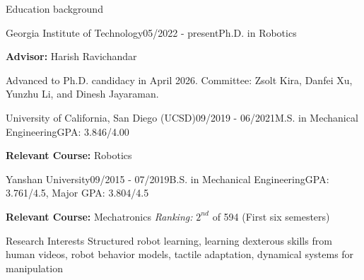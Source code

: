 \documentclass{resume} %
\begin{document}
\begin{rSection}{Education background}
\begin{rSubsection}{Georgia Institute of Technology}{05/2022 - present}{Ph.D. in Robotics}
\item \textbf{Advisor:} Harish Ravichandar
\item Advanced to Ph.D. candidacy in April 2026. Committee: Zsolt Kira, Danfei Xu, Yunzhu Li, and Dinesh Jayaraman.
\end{rSubsection}
\begin{rSubsection}{University of California, San Diego (UCSD)}{09/2019 - 06/2021}{M.S. in Mechanical Engineering}{GPA: 3.846/4.00}
\item \textbf{Relevant Course:} Robotics
\end{rSubsection}
\begin{rSubsection}{Yanshan University}{09/2015 - 07/2019}{B.S. in Mechanical Engineering}{GPA: 3.761/4.5, Major GPA: 3.804/4.5}
\item \textbf{Relevant Course:} Mechatronics \qquad \qquad \qquad \qquad \qquad \qquad \qquad \textit{\large Ranking:} $2^{nd}$ of 594 (First six semesters)
\end{rSubsection}
\end{rSection}
\begin{rSection}{Research Interests}
Structured robot learning, learning dexterous skills from human videos, robot behavior models, tactile adaptation, dynamical systems for manipulation
\end{rSection}
\end{document}

